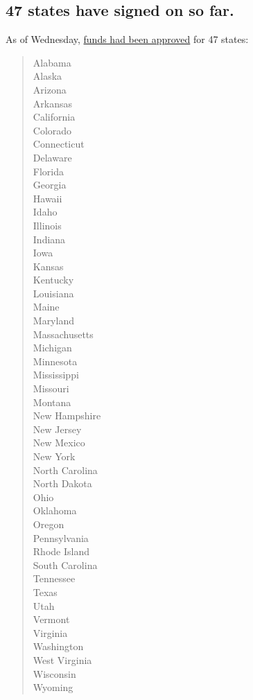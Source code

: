 \hypertarget{47-states-have-signed-on-so-far}{%
\subsection{47 states have signed on so
far.}\label{47-states-have-signed-on-so-far}}

As of Wednesday,
\href{https://www.fema.gov/fact-sheet/lost-wages-assistance-approved-states}{funds
had been approved} for 47 states:

\begin{quote}
Alabama\\
Alaska\\
Arizona\\
Arkansas\\
California\\
Colorado\\
Connecticut\\
Delaware\\
Florida\\
Georgia\\
Hawaii\\
Idaho\\
Illinois\\
Indiana\\
Iowa\\
Kansas\\
Kentucky\\
Louisiana\\
Maine\\
Maryland\\
Massachusetts\\
Michigan\\
Minnesota\\
Mississippi\\
Missouri\\
Montana\\
New Hampshire\\
New Jersey\\
New Mexico\\
New York\\
North Carolina\\
North Dakota\\
Ohio\\
Oklahoma\\
Oregon\\
Pennsylvania\\
Rhode Island\\
South Carolina\\
Tennessee\\
Texas\\
Utah\\
Vermont\\
Virginia\\
Washington\\
West Virginia\\
Wisconsin\\
Wyoming
\end{quote}

